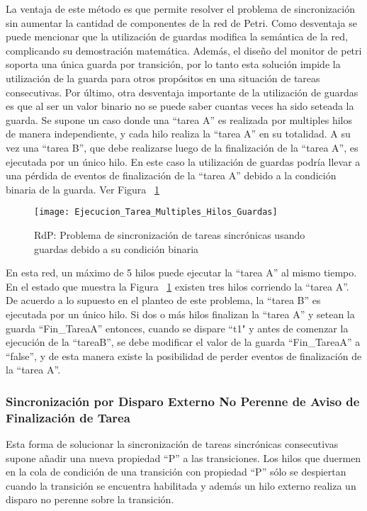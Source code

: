 La ventaja de este método es que permite resolver el problema de sincronización
sin aumentar la cantidad de componentes de la red de Petri.
Como desventaja se puede mencionar que la utilización de guardas modifica la
semántica de la red, complicando su demostración matemática. Además, el diseño del monitor de
petri soporta una única guarda por transición, por lo tanto esta solución impide
la utilización de la guarda para otros propósitos en una situación de tareas
consecutivas. Por último, otra desventaja importante de la utilización de
guardas es que al ser un valor binario no se puede saber cuantas veces ha sido seteada
la guarda.
Se supone un caso donde una ``tarea A'' es realizada por multiples hilos de manera
independiente, y cada hilo realiza la ``tarea A'' en su totalidad. A su
vez una ``tarea B'', que debe realizarse luego de la finalización de la ``tarea
A'', es ejecutada por un único hilo. En este caso la utilización de guardas
podría llevar a una pérdida de eventos de finalización de la ``tarea A'' debido
a la condición binaria de la guarda. Ver Figura ~\ref{fig:ejecucion_multiples_hilos_guardas}

\begin{figure}[H]
    \centering
    \texttt{[image: Ejecucion\_Tarea\_Multiples\_Hilos\_Guardas]}
    \caption{RdP: Problema de sincronización de tareas sincrónicas usando
    guardas debido a su condición binaria}
    \label{fig:ejecucion_multiples_hilos_guardas}
\end{figure}

En esta red, un máximo de 5 hilos puede ejecutar la ``tarea A'' al mismo
tiempo. En el estado que  muestra la Figura
~\ref{fig:ejecucion_multiples_hilos_guardas} existen tres hilos corriendo la
``tarea A''. De acuerdo a lo supuesto en el planteo de este problema, la ``tarea
B'' es ejecutada por un único hilo. Si dos o más hilos finalizan la ``tarea A''
y setean la guarda ``Fin\_TareaA'' entonces, cuando se dispare ``t1" y antes de
comenzar la ejecución de la ``tareaB'', se debe modificar el valor de la guarda
``Fin\_TareaA'' a ``false'', y de esta manera existe la posibilidad de perder
eventos de finalización de la ``tarea A''.

\subsubsection{Sincronización por Disparo Externo No Perenne de Aviso de
Finalización de Tarea}
Esta forma de solucionar la sincronización de tareas sincrónicas consecutivas
supone añadir una nueva propiedad ``P'' a las transiciones. Los hilos que
duermen en la cola de condición de una transición con propiedad ``P'' sólo
se despiertan cuando la transición se encuentra habilitada y además un hilo
externo realiza un disparo no perenne sobre la transición.

